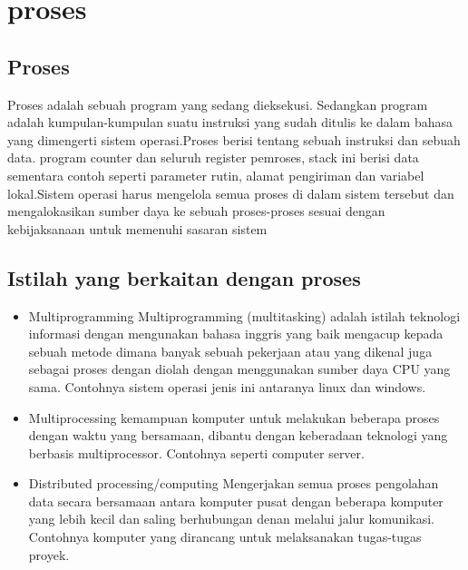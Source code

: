 
\section{proses}

	\subsection{Proses}	
	Proses adalah sebuah  program yang sedang dieksekusi. Sedangkan program adalah kumpulan-kumpulan  suatu  instruksi yang sudah  ditulis ke dalam bahasa yang dimengerti sistem operasi.Proses berisi tentang  sebuah instruksi dan sebuah  data. program counter dan seluruh register pemroses, stack ini  berisi data sementara contoh  seperti parameter rutin, alamat pengiriman dan variabel lokal.Sistem operasi harus mengelola semua proses di dalam sistem tersebut dan mengalokasikan sumber daya ke sebuah  proses-proses sesuai dengan kebijaksanaan untuk memenuhi sasaran sistem
	
	\subsection{Istilah yang berkaitan dengan proses}
		\begin{itemize}
			\item Multiprogramming
			Multiprogramming (multitasking) adalah  istilah teknologi informasi dengan mengunakan bahasa inggris yang baik  mengacup kepada sebuah metode dimana banyak sebuah pekerjaan atau yang dikenal juga sebagai proses  dengan diolah dengan menggunakan sumber daya CPU yang sama.
			Contohnya sistem operasi jenis ini antaranya linux dan windows.
			\item Multiprocessing
			kemampuan komputer untuk melakukan beberapa proses dengan waktu yang bersamaan, dibantu dengan keberadaan teknologi yang berbasis multiprocessor.
			Contohnya seperti computer server.
			\item Distributed processing/computing
			Mengerjakan semua proses pengolahan data secara bersamaan antara komputer pusat dengan beberapa komputer yang lebih kecil dan saling berhubungan denan melalui jalur komunikasi.
			Contohnya komputer yang dirancang untuk melaksanakan tugas-tugas proyek.
		\end{itemize}
		
